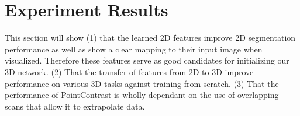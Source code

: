 \documentclass[10pt,twocolumn,letterpaper]{article}
\begin{document}
\begin{table}[t!]
    \centering
    \caption{KITTI Semantic Segmentation results (mIOU)}
    \label{table:kittiSemanticResults}
\end{table}

\begin{table}[t!]
    \centering
    \caption{Object Detection using VoteNet  (mAP)}
    \label{table:scannetObjectDetection}
\end{table}

\section{Experiment Results}
\label{sec:results}

This section will show (1) that the learned 2D features improve 2D segmentation performance as well as show a clear mapping to their input image when visualized. Therefore these features serve as good candidates for initializing our 3D network. (2) That the transfer of features from 2D to 3D improve performance on various 3D tasks against training from scratch. (3) That the performance of PointContrast is wholly dependant on the use of overlapping scans that allow it to extrapolate data.
\end{document}
